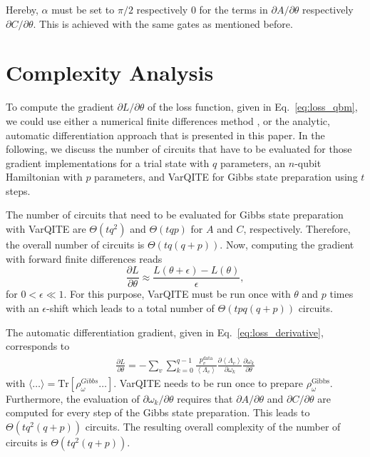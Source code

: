 \documentclass[twocolumn, aps, pra, superscriptaddress, floatfix]{revtex4}
\begin{document}
Hereby, $\alpha$ must be set to $\pi/2$ respectively $0$ for the terms in $\partial A/ \partial\theta$ respectively $\partial C/ \partial\theta$. This is achieved with the same gates as mentioned before.

\section{Complexity Analysis}
\label{app:complexity}

To compute the gradient $ \partial L / \partial \theta$ of the loss function, given in Eq.~\eqref{eq:loss_qbm}, we could use either a numerical finite differences method \cite{Kardestuncer1975}, or the analytic, automatic differentiation approach that is presented in this paper. In the following, we discuss the number of circuits that have to be evaluated for those gradient implementations for a trial state with $q$ parameters, an $n$-qubit Hamiltonian with $p$ parameters, and VarQITE for Gibbs state preparation using $t$ steps.

The number of circuits that need to be evaluated for Gibbs state preparation with VarQITE are $\Theta\left(tq^2 \right)$ and $\Theta\left(tqp \right)$ for $A$ and $C$, respectively.
Therefore, the overall number of circuits is $\Theta\left(tq(q+p)\right)$.
Now, computing the gradient with forward finite differences reads
\begin{equation*}
    \frac{\partial L}{\partial \theta} \approx  \frac{L\left( \theta + \epsilon \right) - L\left( \theta  \right)}{\epsilon},
\end{equation*}
for $0 < \epsilon \ll 1$. 
For this purpose, VarQITE must be run once with $\theta$ and $p$ times with an $\epsilon$-shift which leads to a total number of $\Theta\left(tpq(q+p)\right)$ circuits.

The automatic differentiation gradient, given in Eq.~\eqref{eq:loss_derivative}, corresponds to
\begin{equation*}
\begin{split}
	\frac{\partial L}{\partial\theta} = - \sum\limits_{v}\sum\limits_{k=0}^{q-1}\frac{p_v^{\text{data}}}{\left\langle \Lambda_v\right\rangle} \frac{\partial \left\langle \Lambda_v \right\rangle}{\partial \omega_k} \frac{\partial \omega_k} {\partial \theta}
		\end{split}
\end{equation*}
with $\langle \ldots \rangle = \text{Tr}\left[\rho_{\omega}^{Gibbs}\ldots\right]$.
VarQITE needs to be run once to prepare $\rho_{\omega}^{\text{Gibbs}}$. Furthermore, the evaluation of $\partial\omega_k / \partial\theta$ requires that $\partial A / \partial\theta$ and $\partial C / \partial\theta$ are computed for every step of the Gibbs state preparation. This leads to $\Theta\left(tq^2(q+p)\right)$ circuits.
The resulting overall complexity of the number of circuits is $\Theta\left(tq^2(q+p)\right)$.
\end{document}
